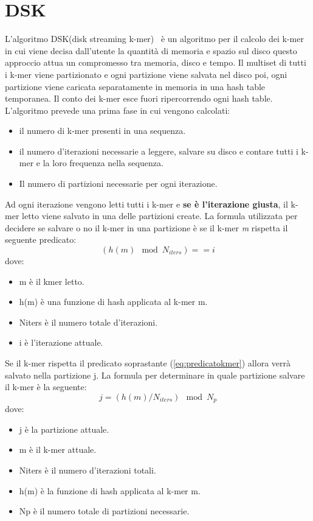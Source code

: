 \section{DSK}\label{sec:dsk}
L'algoritmo DSK(disk streaming k-mer)~\cite{DSK} \`e un algoritmo per il calcolo dei k-mer
in cui viene decisa dall'utente la quantità di memoria e spazio sul disco
questo approccio attua un compromesso tra memoria, disco e tempo.
Il multiset di tutti i k-mer viene partizionato e ogni partizione viene salvata
nel disco poi, ogni partizione viene caricata separatamente in memoria in una
hash table temporanea.
Il conto dei k-mer esce fuori ripercorrendo ogni hash table.
L'algoritmo prevede una prima fase in cui vengono calcolati:
\begin{itemize}
 \item il numero di k-mer presenti in una sequenza.
 \item il numero d'iterazioni necessarie a leggere, salvare su disco e contare tutti i k-mer e la loro frequenza nella sequenza.
 \item Il numero di partizioni necessarie per ogni iterazione.
\end{itemize}
Ad ogni iterazione vengono letti tutti i k-mer e \textbf{se \`e l'iterazione giusta}, il k-mer letto viene salvato in una delle partizioni create.
La formula utilizzata per decidere se salvare o no il k-mer in una partizione \`e se il k-mer \textit{m } rispetta il seguente predicato:
\begin{equation}\label{eq:predicatokmer}
    (h(m) \mod N_{iters}) == i
\end{equation}
dove:
\begin{itemize}
    \item m \`e il kmer letto.
    \item h(m) \`e una funzione di hash applicata al k-mer m.
    \item Niters \`e il numero totale d'iterazioni.
    \item i \`e l'iterazione attuale.
\end{itemize}
Se il k-mer rispetta il predicato soprastante (\ref{eq:predicatokmer}) allora verr\`a salvato nella partizione j.
La formula per determinare in quale partizione salvare il k-mer \`e la seguente:
\begin{equation} \label{eq:partizionegiusta}
    j = (h(m)/N_{iters}) \mod N_{p}
\end{equation}
dove:
\begin{itemize}
    \item j \`e la partizione attuale.
    \item m \`e il k-mer attuale.
    \item Niters \`e il numero d'iterazioni totali.
    \item h(m) \`e la funzione di hash applicata al k-mer m.
    \item Np \`e il numero totale di partizioni necessarie.
\end{itemize}
